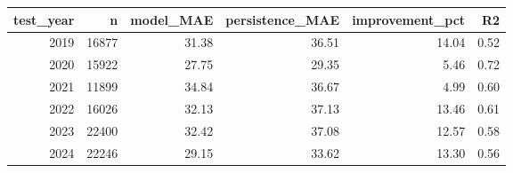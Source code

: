 \begin{tabular}{rrrrrr}
\toprule
test_year & n & model_MAE & persistence_MAE & improvement_pct & R2 \\
\midrule
2019 & 16877 & 31.38 & 36.51 & 14.04 & 0.52 \\
2020 & 15922 & 27.75 & 29.35 & 5.46 & 0.72 \\
2021 & 11899 & 34.84 & 36.67 & 4.99 & 0.60 \\
2022 & 16026 & 32.13 & 37.13 & 13.46 & 0.61 \\
2023 & 22400 & 32.42 & 37.08 & 12.57 & 0.58 \\
2024 & 22246 & 29.15 & 33.62 & 13.30 & 0.56 \\
\bottomrule
\end{tabular}
